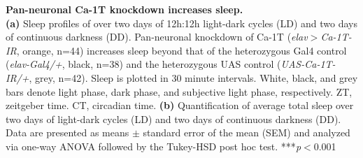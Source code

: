 \label{fig:5}
\textbf{Pan-neuronal Ca-\alpha1T knockdown increases sleep.}
\\
\textbf{(a)} Sleep profiles of over two days of 12h:12h light-dark cycles (LD) and two days of continuous darkness (DD). Pan-neuronal knockdown of Ca-\alpha1T (\emph{elav$>$Ca-\alpha1T-IR}, orange, n=44) increases sleep beyond that of the heterozygous Gal4 control (\emph{elav-Gal4/+}, black, n=38) and the heterozygous UAS control (\emph{UAS-Ca-\alpha1T-IR/+}, grey, n=42).
Sleep is plotted in 30 minute intervals.
White, black, and grey bars denote light phase, dark phase, and subjective light phase, respectively.
ZT, zeitgeber time.
CT, circadian time.
\textbf{(b)} Quantification of average total sleep over two days of light-dark cycles (LD) and two days of continuous darkness (DD).
Data are presented as means $\pm$ standard error of the mean (SEM) and analyzed via one-way ANOVA followed by the Tukey-HSD post hoc test.
***\emph{p}$<$0.001
